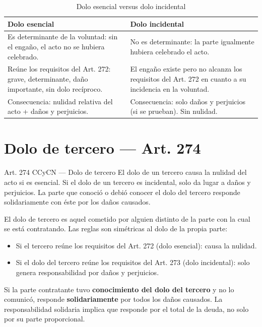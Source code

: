 \documentclass[12pt,oneside]{book}
\begin{document}
\begin{table}[H]
\centering
\begin{tabularx}{\textwidth}{>{\raggedright\arraybackslash}X >{\raggedright\arraybackslash}X}
\toprule
\textbf{Dolo esencial} & \textbf{Dolo incidental} \\
\midrule
Es determinante de la voluntad: sin el engaño, el acto no se hubiera celebrado. & No es determinante: la parte igualmente hubiera celebrado el acto. \\[4pt]
Reúne los requisitos del Art. 272: grave, determinante, daño importante, sin dolo recíproco. & El engaño existe pero no alcanza los requisitos del Art. 272 en cuanto a su incidencia en la voluntad. \\[4pt]
Consecuencia: nulidad relativa del acto + daños y perjuicios. & Consecuencia: solo daños y perjuicios (si se prueban). Sin nulidad. \\
\bottomrule
\end{tabularx}
\caption{Dolo esencial versus dolo incidental}
\end{table}

\section{Dolo de tercero --- Art. 274}

\begin{articulo}{Art. 274 CCyCN --- Dolo de tercero}
El dolo de un tercero causa la nulidad del acto si es esencial. Si el dolo de un tercero es incidental, solo da lugar a daños y perjuicios. La parte que conoció o debió conocer el dolo del tercero responde solidariamente con éste por los daños causados.
\end{articulo}

El dolo de tercero es aquel cometido por alguien distinto de la parte con la cual se está contratando. Las reglas son simétricas al dolo de la propia parte:

\begin{itemize}
    \item Si el tercero reúne los requisitos del Art. 272 (dolo esencial): causa la nulidad.
    \item Si el dolo del tercero reúne los requisitos del Art. 273 (dolo incidental): solo genera responsabilidad por daños y perjuicios.
\end{itemize}

Si la parte contratante tuvo \textbf{conocimiento del dolo del tercero} y no lo comunicó, responde \textbf{solidariamente} por todos los daños causados. La responsabilidad solidaria implica que responde por el total de la deuda, no solo por su parte proporcional.
\end{document}
